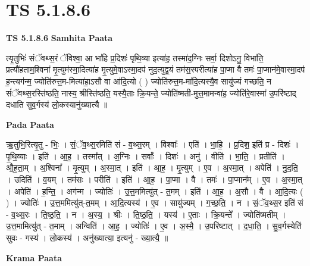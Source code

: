 \documentclass[17pt]{extarticle}
\begin{document}
\section{ TS 5.1.8.6 }

\textbf{TS 5.1.8.6 } \newline
\textbf{Samhita Paata} \newline

त्यृ॒तुभिः॑ संॅवथ्स॒रं ॅविश्वा॒ आ भा॑हि प्र॒दिशः॑ पृथि॒व्या इत्या॑ह॒ तस्मा॑द॒ग्निः सर्वा॒ दिशोऽनु॒ विभा॑ति॒ प्रत्यौ॑हताम॒श्विना॑ मृ॒त्युम॑स्मा॒दित्या॑ह मृ॒त्युमे॒वाऽस्मा॒दप॑ नुद॒त्युद्व॒यं तम॑स॒स्परीत्या॑ह पा॒प्मा वै तमः॑ पा॒प्मान॑मे॒वास्मा॒दप॑ ह॒न्त्यग॑न्म॒ ज्योति॑रुत्त॒म-मित्या॑हा॒ऽसौ वा आ॑दि॒त्यो ( ) ज्योति॑रुत्त॒म-मा॑दि॒त्यस्यै॒व सायु॑ज्यं गच्छति॒ न सं॑ॅवथ्स॒रस्ति॑ष्ठति॒ नास्य॒ श्रीस्ति॑ष्ठति॒ यस्यै॒ताः क्रि॒यन्ते॒ ज्योति॑ष्मती-मुत्त॒मामन्वा॑ह॒ ज्योति॑रे॒वास्मा॑ उ॒परि॑ष्टाद् दधाति सुव॒र्गस्य॑ लो॒कस्यानु॑ख्यात्यै ॥ \newline

\textbf{Pada Paata} \newline

ऋ॒तुभि॒रित्यृ॒तु - भिः॒ । सं॒ॅव॒थ्स॒रमिति॑ सं - व॒थ्स॒रम् । विश्वाः᳚ । एति॑ । भा॒हि॒ । प्र॒दिश॒ इति॑ प्र - दिशः॑ । पृ॒थि॒व्याः । इति॑ । आ॒ह॒ । तस्मा᳚त् । अ॒ग्निः । सर्वाः᳚ । दिशः॑ । अनु॑ । वीति॑ । भा॒ति॒ । प्रतीति॑ । औ॒ह॒ता॒म् । अ॒श्विना᳚ । मृ॒त्युम् । अ॒स्मा॒त् । इति॑ । आ॒ह॒ । मृ॒त्युम् । ए॒व । अ॒स्मा॒त् । अपेति॑ । नु॒द॒ति॒ । उदिति॑ । व॒यम् । तम॑सः । परीति॑ । इति॑ । आ॒ह॒ । पा॒प्मा । वै । तमः॑ । पा॒प्मान᳚म् । ए॒व । अ॒स्मा॒त् । अपेति॑ । ह॒न्ति॒ । अग॑न्म । ज्योतिः॑ । उ॒त्त॒ममित्यु॑त् - त॒मम् । इति॑ । आ॒ह॒ । अ॒सौ । वै । आ॒दि॒त्यः ( ) । ज्योतिः॑ । उ॒त्त॒ममित्यु॑त्-त॒मम् । आ॒दि॒त्यस्य॑ । ए॒व । सायु॑ज्यम् । ग॒च्छ॒ति॒ । न । सं॒ॅव॒थ्स॒र इति॑ सं - व॒थ्स॒रः । ति॒ष्ठ॒ति॒ । न । अ॒स्य॒ । श्रीः । ति॒ष्ठ॒ति॒ । यस्य॑ । ए॒ताः । क्रि॒यन्ते᳚ । ज्योति॑ष्मतीम् । उ॒त्त॒मामित्यु॑त् - त॒माम् । अन्विति॑ । आ॒ह॒ । ज्योतिः॑ । ए॒व । अ॒स्मै॒ । उ॒परि॑ष्टात् । द॒धा॒ति॒ । सु॒व॒र्गस्येति॑ सुवः - गस्य॑ । लो॒कस्य॑ । अनु॑ख्यात्या॒ इत्यनु॑ - ख्या॒त्यै॒ ॥  \newline


\textbf{Krama Paata} \newline
\end{document}

